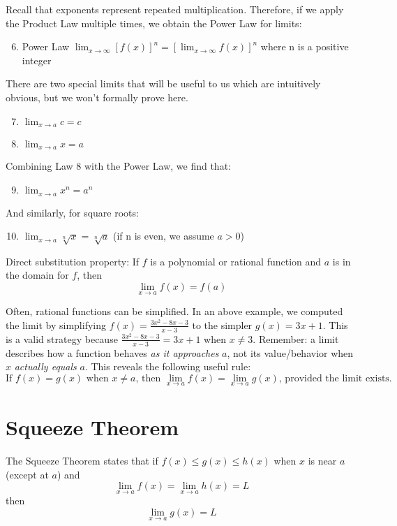 Recall that exponents represent repeated multiplication. Therefore, if we apply the 
Product Law multiple times, we obtain the Power Law for limits:
\begin{enumerate}
    \setcounter{enumi}{5}
    \item Power Law $\lim_{x\to\infty} \left[f(x)\right]^n = \left[\lim_{x\to\infty}f(x)\right]^n$ where n is a positive integer
\end{enumerate}
There are two special limits that will be useful to us which are intuitively 
obvious, but we won't formally prove here.  
\begin{enumerate}
    \setcounter{enumi}{6}
    \item $\lim_{x\to a} \textit{c} = \textit{c}$
    \item $\lim_{x\to a} x = a$
\end{enumerate}
Combining Law 8 with the Power Law, we find that:
\begin{enumerate}
\setcounter{enumi}{8}
    \item $\lim_{x\to a} x^n = a^n$
\end{enumerate}
And similarly, for square roots:
\begin{enumerate}
    \setcounter{enumi}{9}
    \item $\lim_{x\to a} \sqrt[n]{x} = \sqrt[n]{a}$ (if n is even, we assume $a > 0$)
\end{enumerate}

Direct substitution property: If $f$ is a polynomial or rational function and $a$ 
is in the domain for $f$, then $$\lim_{x \to a}f(x) = f(a)$$

Often, rational functions can be simplified. In an above example, we computed the 
limit by simplifying $f(x) = \frac{3x^2-8x-3}{x-3}$ to the simpler $g(x) = 3x+1$. 
This is a valid strategy because $\frac{3x^2-8x-3}{x-3} = 3x+1$ when $x \neq 3$. 
Remember: a limit describes how a function behaves \textit{as it approaches} $a$, 
not its value/behavior when $x$ \textit{actually equals} $a$. This reveals the 
following useful rule: $$\text{If } f(x)=g(x) \text{ when } x \neq a \text{, then } 
\lim_{x \to a}f(x) = \lim_{x \to a}g(x) \text{, provided the limit exists.}$$

\section{Squeeze Theorem}

The Squeeze Theorem states that if $f(x) \leq g(x) \leq h(x)$ when $x$ is near $a$ 
(except at $a$) and $$\lim_{x \to a}f(x)=\lim_{x \to a}h(x) = L$$ then $$\lim_{x 
\to a}g(x) = L$$

